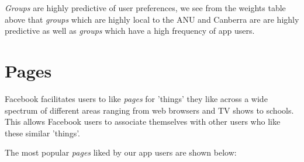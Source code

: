 \emph{Groups} are highly predictive of user preferences, we see from the weights table above that \emph{groups} which are highly local to 
the ANU and Canberra are are highly predictive as well as \emph{groups} which have a high frequency of app users.

\section{Pages}
\label{sec:pages}

Facebook facilitates users to like \emph{pages} for 'things' they like across a wide spectrum of different areas ranging from 
web browsers and TV shows to schools. This allows Facebook users to associate themselves with other users who like these similar 'things'.

\clearpage

The most popular \emph{pages} liked by our app users are shown below:

